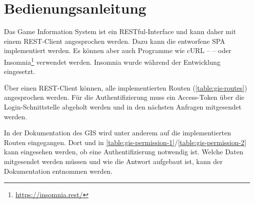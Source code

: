 \section{Bedienungsanleitung}

Das Game Information System ist ein RESTful-Interface und kann daher mit einem REST-Client angesprochen werden. Dazu kann die entworfene SPA implementiert werden. Es können aber auch Programme wie cURL --  -- oder Insomnia\footnote{\url{https://insomnia.rest/}} verwendet werden. Insomnia wurde während der Entwicklung eingesetzt.

Über einen REST-Client können, alle implementierten Routen (\autoref{table:gis-routes}) angesprochen werden. Für die Authentifizierung muss ein Access-Token über die Login-Schnittstelle abgeholt werden und in den nächsten Anfragen mitgesendet werden.

In der Dokumentation des GIS wird unter anderem auf die implementierten Routen eingegangen. Dort und in \autoref{table:gis-permission-1}/\ref{table:gis-permission-2} kann eingesehen werden, ob eine Authentifizierung notwendig ist. Welche Daten mitgesendet werden müssen und wie die Antwort aufgebaut ist, kann der Dokumentation entnommen werden.